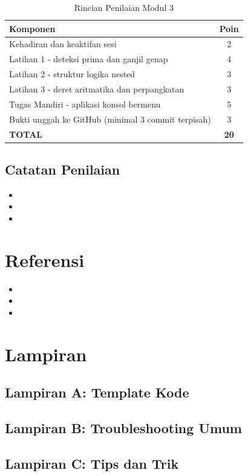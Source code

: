 \documentclass[12pt,a4paper]{article}
\begin{document}
\begin{table}[h]
\centering
\caption{Rincian Penilaian Modul 3}
\begin{tabular}{|l|c|}
\hline
\textbf{Komponen} & \textbf{Poin} \\
\hline
Kehadiran dan keaktifan sesi & 2 \\
\hline
Latihan 1 - deteksi prima dan ganjil genap & 4 \\
\hline
Latihan 2 - struktur logika nested & 3 \\
\hline
Latihan 3 - deret aritmatika dan perpangkatan & 3 \\
\hline
Tugas Mandiri - aplikasi konsol bermenu & 5 \\
\hline
Bukti unggah ke GitHub (minimal 3 commit terpisah) & 3 \\
\hline
\textbf{TOTAL} & \textbf{20} \\
\hline
\end{tabular}
\end{table}

\subsection{Catatan Penilaian}

\begin{itemize}
    \item 
    \item 
    \item 
\end{itemize}

\section{Referensi}

\begin{itemize}
    \item 
    \item 
    \item 
\end{itemize}

\newpage
\section*{Lampiran}

\subsection*{Lampiran A: Template Kode}

\subsection*{Lampiran B: Troubleshooting Umum}

\subsection*{Lampiran C: Tips dan Trik}
\end{document}
